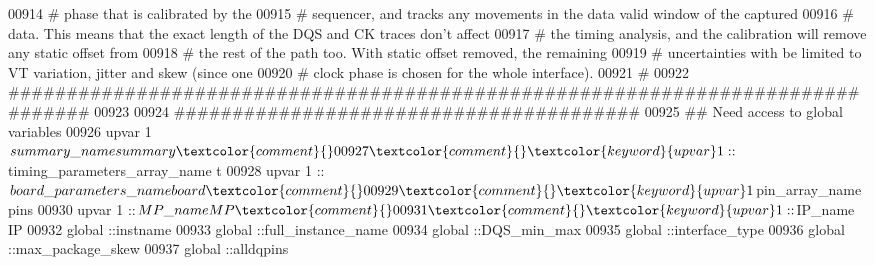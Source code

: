 \begin{DoxyCode}
00914 \textcolor{comment}{}\textcolor{comment}{   }\textcolor{comment}{# phase that is calibrated by the}
00915 \textcolor{comment}{}\textcolor{comment}{   }\textcolor{comment}{# sequencer, and tracks any movements in the data valid window of the captured}
00916 \textcolor{comment}{}\textcolor{comment}{   }\textcolor{comment}{# data. This means that the exact length of the DQS and CK traces don't affect}
00917 \textcolor{comment}{}\textcolor{comment}{   }\textcolor{comment}{# the timing analysis, and the calibration will remove any static offset from}
00918 \textcolor{comment}{}\textcolor{comment}{   }\textcolor{comment}{# the rest of the path too. With static offset removed, the remaining}
00919 \textcolor{comment}{}\textcolor{comment}{   }\textcolor{comment}{# uncertainties with be limited to VT variation, jitter and skew (since one}
00920 \textcolor{comment}{}\textcolor{comment}{   }\textcolor{comment}{# clock phase is chosen for the whole interface).}
00921 \textcolor{comment}{}\textcolor{comment}{   }\textcolor{comment}{# }
00922 \textcolor{comment}{}\textcolor{comment}{   }\textcolor{comment}{################################################################################}
00923 \textcolor{comment}{}
00924    \textcolor{comment}{########################################}
00925 \textcolor{comment}{}\textcolor{comment}{   }\textcolor{comment}{## Need access to global variables}
00926 \textcolor{comment}{}\textcolor{comment}{   }\textcolor{keyword}{upvar} 1 $summary\_name summary\textcolor{comment}{}
00927 \textcolor{comment}{}   \textcolor{keyword}{upvar} 1 ::$timing\_parameters\_array\_name t\textcolor{comment}{}
00928 \textcolor{comment}{}   \textcolor{keyword}{upvar} 1 ::$board\_parameters\_name board\textcolor{comment}{      }
00929 \textcolor{comment}{}   \textcolor{keyword}{upvar} 1 $pin\_array\_name pins\textcolor{comment}{}
00930 \textcolor{comment}{}   \textcolor{keyword}{upvar} 1 ::$MP\_name MP\textcolor{comment}{}
00931 \textcolor{comment}{}   \textcolor{keyword}{upvar} 1 ::$IP\_name IP\textcolor{comment}{}
00932 \textcolor{comment}{}   \textcolor{keyword}{global} ::instname\textcolor{comment}{}
00933 \textcolor{comment}{}   \textcolor{keyword}{global} ::full\_instance\_name\textcolor{comment}{}
00934 \textcolor{comment}{}   \textcolor{keyword}{global} ::DQS\_min\_max\textcolor{comment}{}
00935 \textcolor{comment}{}   \textcolor{keyword}{global} ::interface\_type\textcolor{comment}{}
00936 \textcolor{comment}{}   \textcolor{keyword}{global} ::max\_package\_skew\textcolor{comment}{}
00937 \textcolor{comment}{}   \textcolor{keyword}{global} ::alldqpins\textcolor{comment}{}

\end{DoxyCode}

